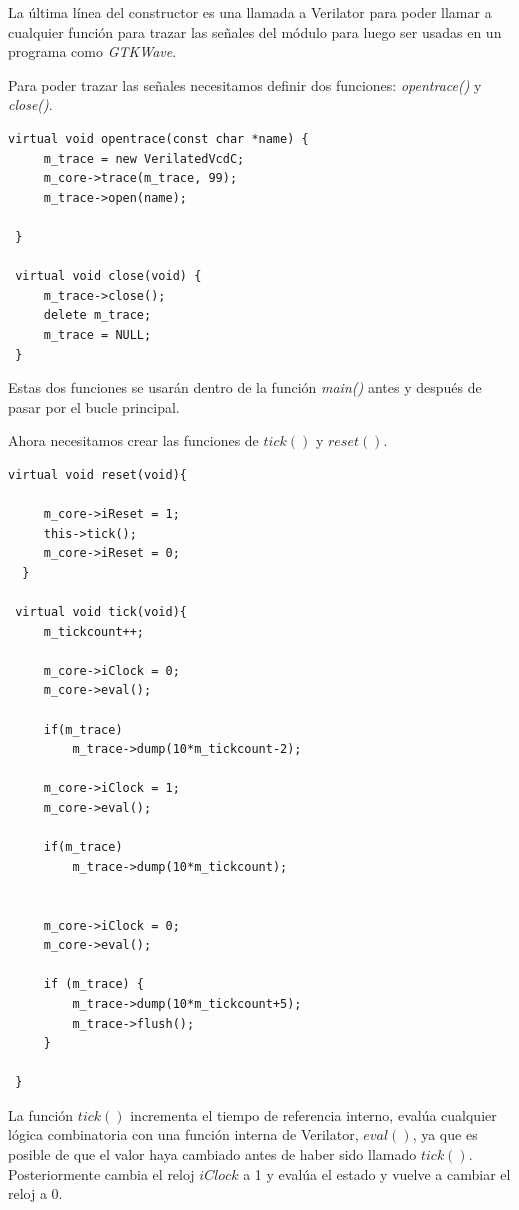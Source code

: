 La última línea del constructor es una llamada a Verilator para poder llamar a cualquier función para trazar las señales del módulo para luego ser usadas en un programa como \textit{GTKWave}.

Para poder trazar las señales necesitamos definir dos funciones: \textit{opentrace()} y \textit{close()}.

\begin{lstlisting}[caption={Definición de funciones para trazar la simulación.}]
 virtual void opentrace(const char *name) {
     m_trace = new VerilatedVcdC;
     m_core->trace(m_trace, 99);
     m_trace->open(name);

 }

 virtual void close(void) {
     m_trace->close();
     delete m_trace;
     m_trace = NULL;
 }
\end{lstlisting}

Estas dos funciones se usarán dentro de la función \textit{main()} antes y después de pasar por el bucle principal.

Ahora necesitamos crear las funciones de $tick()$ y $reset()$.

\begin{lstlisting}[caption={Definición de funciones \textit{reset()} y \textit{tick()}}]
  virtual void reset(void){

     m_core->iReset = 1;
     this->tick();
     m_core->iReset = 0;
  }

 virtual void tick(void){
     m_tickcount++;

     m_core->iClock = 0;
     m_core->eval();
     
     if(m_trace) 
         m_trace->dump(10*m_tickcount-2);

     m_core->iClock = 1;
     m_core->eval();
     
     if(m_trace)
         m_trace->dump(10*m_tickcount);
     

     m_core->iClock = 0;
     m_core->eval();
     
     if (m_trace) {
         m_trace->dump(10*m_tickcount+5);
         m_trace->flush();
     }
     
 }
\end{lstlisting}

La función $tick()$ incrementa el tiempo de referencia interno, evalúa cualquier lógica combinatoria con una función interna de Verilator, $eval()$, ya que es posible de que el valor haya cambiado antes de haber sido llamado $tick()$. Posteriormente cambia el reloj $iClock$ a 1 y evalúa el estado y vuelve a cambiar el reloj a 0.

